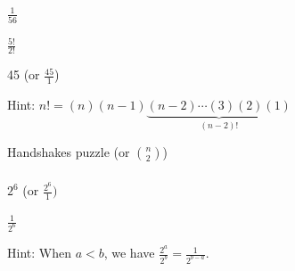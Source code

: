 \subsubsection*{ \answers}
\begin{apart}
    \item $\frac{1}{56}$
    \item $\frac{5!}{2!}$
    \item 45 (or $\frac{45}{1}$)
    \item Hint: $n!=(n)(n-1)\underbrace{(n-2)\cdots(3)(2)(1)}_{(n-2)!}$
    \item Handshakes puzzle (or $\binom{n}{2}$)
\end{apart}

\subsubsection*{ \answers}
\begin{apart}
    \item $2^6$ (or $\frac{2^6}{1})$
    \item $\frac{1}{2^6}$
    \item Hint: When $a < b$, we have $\frac{2^a}{2^b} = \frac{1}{2^{b-a}}$. 
\end{apart}